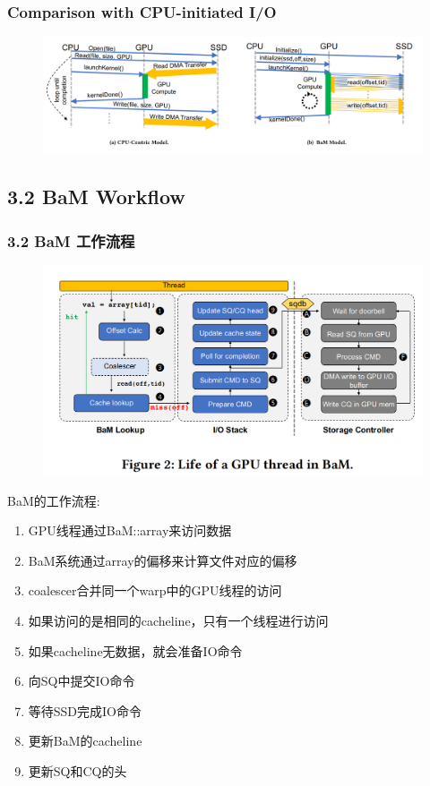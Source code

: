 \documentclass[10pt]{ctexbeamer}
\begin{document}
\begin{frame}
  \frametitle{Comparison with CPU-initiated I/O}
  \begin{figure}
    \includegraphics[width=.8\textwidth, height=.8\textheight, keepaspectratio]{images/comparison.png}
  \end{figure}
\end{frame}

\subsection{3.2 BaM Workflow}\label{sec:3-2}
\begin{frame}[t]
  \frametitle{3.2 BaM 工作流程}
    \begin{figure}
      \includegraphics[width=.5\textwidth, height=.5\textheight, keepaspectratio]{images/bam-workflow.png}
    \end{figure}
    \begin{minipage}{0.5\textwidth}
      BaM的工作流程:
      \begin{enumerate}
        \item GPU线程通过BaM::array来访问数据
        \item BaM系统通过array的偏移来计算文件对应的偏移
        \item coalescer合并同一个warp中的GPU线程的访问
        \item 如果访问的是相同的cacheline，只有一个线程进行访问
        \item 如果cacheline无数据，就会准备IO命令
        \item 向SQ中提交IO命令
        \item 等待SSD完成IO命令
        \item 更新BaM的cacheline
        \item 更新SQ和CQ的头
      \end{enumerate}      
    \end{minipage}
\end{frame}
\end{document}
